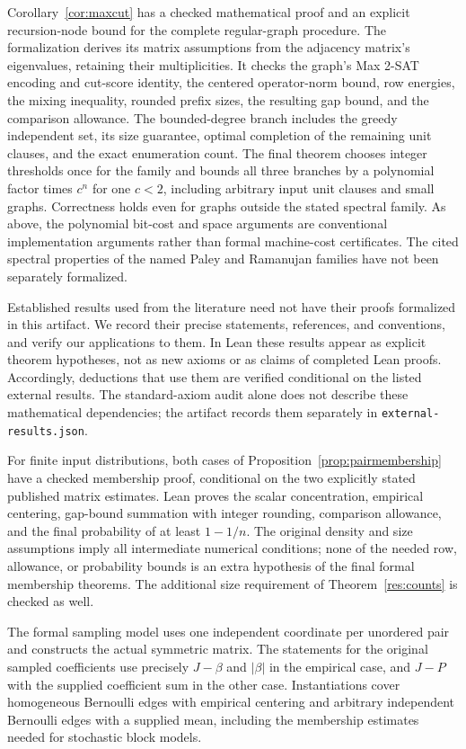 \documentclass[11pt,a4paper]{article}
\theoremstyle{definition}
\theoremstyle{remark}
\begin{document}
Corollary~\ref{cor:maxcut} has a checked mathematical proof and
an explicit recursion-node bound for the complete regular-graph procedure.
The formalization derives its matrix assumptions from the adjacency
matrix's eigenvalues, retaining their multiplicities. It checks the graph's
Max 2-SAT encoding and cut-score identity, the centered operator-norm bound,
row energies, the mixing inequality, rounded prefix sizes, the resulting
gap bound, and the comparison allowance. The bounded-degree branch
includes the greedy independent set, its size guarantee, optimal completion
of the remaining unit clauses, and the exact enumeration count.
The final theorem chooses integer thresholds once for the family and
bounds all three branches by a polynomial factor times $c^n$ for one
$c<2$, including arbitrary input unit clauses and small graphs.
Correctness holds even for graphs outside the stated spectral family.
As above, the polynomial bit-cost and space arguments are conventional
implementation arguments rather than formal machine-cost certificates.
The cited spectral properties of the named Paley and Ramanujan families
have not been separately formalized.

Established results used from the literature need not have their proofs
formalized in this artifact. We record their precise statements, references,
and conventions, and verify our applications to them. In Lean these results
appear as explicit theorem hypotheses, not as new axioms or as claims of
completed Lean proofs. Accordingly, deductions that use them are verified
conditional on the listed external results. The standard-axiom audit alone
does not describe these mathematical dependencies; the artifact records
them separately in \texttt{external-results.json}.

For finite input distributions, both cases of
Proposition~\ref{prop:pairmembership} have a checked membership proof,
conditional on the two explicitly stated published matrix estimates.
Lean proves the scalar concentration, empirical centering, gap-bound
summation with integer rounding, comparison allowance, and the final
probability of at least $1-1/n$. The original density and size assumptions
imply all intermediate numerical conditions; none of the needed row,
allowance, or probability bounds is an extra hypothesis of the final
formal membership theorems. The additional size requirement of
Theorem~\ref{res:counts} is checked as well.

The formal sampling model uses one independent coordinate per unordered
pair and constructs the actual symmetric matrix. The statements for the
original sampled coefficients use precisely $J-\beta$ and $|\beta|$ in the
empirical case, and $J-P$ with the supplied coefficient sum in the other
case. Instantiations cover homogeneous Bernoulli edges with empirical
centering and arbitrary independent Bernoulli edges with a supplied mean,
including the membership estimates needed for stochastic block models.
\end{document}
